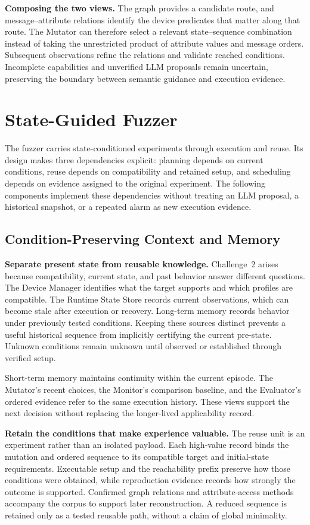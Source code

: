 \documentclass[10pt,journal,compsoc]{IEEEtran}
\newcommand{\parab}[1]{\vspace{0.04in}\noindent\textbf{#1}}
\begin{document}
\parab{Composing the two views.}
The graph provides a candidate route, and message--attribute relations identify the device predicates that matter along that route. The Mutator can therefore select a relevant state--sequence combination instead of taking the unrestricted product of attribute values and message orders. Subsequent observations refine the relations and validate reached conditions. Incomplete capabilities and unverified LLM proposals remain uncertain, preserving the boundary between semantic guidance and execution evidence.

\section{State-Guided Fuzzer}\label{sec:fuzzer}
The fuzzer carries state-conditioned experiments through execution and reuse. Its design makes three dependencies explicit: planning depends on current conditions, reuse depends on compatibility and retained setup, and scheduling depends on evidence assigned to the original experiment. The following components implement these dependencies without treating an LLM proposal, a historical snapshot, or a repeated alarm as new execution evidence.

\subsection{Condition-Preserving Context and Memory}\label{sec:context}
\parab{Separate present state from reusable knowledge.}
Challenge~2 arises because compatibility, current state, and past behavior answer different questions. The Device Manager identifies what the target supports and which profiles are compatible. The Runtime State Store records current observations, which can become stale after execution or recovery. Long-term memory records behavior under previously tested conditions. Keeping these sources distinct prevents a useful historical sequence from implicitly certifying the current pre-state. Unknown conditions remain unknown until observed or established through verified setup.

Short-term memory maintains continuity within the current episode. The Mutator's recent choices, the Monitor's comparison baseline, and the Evaluator's ordered evidence refer to the same execution history. These views support the next decision without replacing the longer-lived applicability record.

\parab{Retain the conditions that make experience valuable.}
The reuse unit is an experiment rather than an isolated payload. Each high-value record binds the mutation and ordered sequence to its compatible target and initial-state requirements. Executable setup and the reachability prefix preserve how those conditions were obtained, while reproduction evidence records how strongly the outcome is supported. Confirmed graph relations and attribute-access methods accompany the corpus to support later reconstruction. A reduced sequence is retained only as a tested reusable path, without a claim of global minimality.
\end{document}
